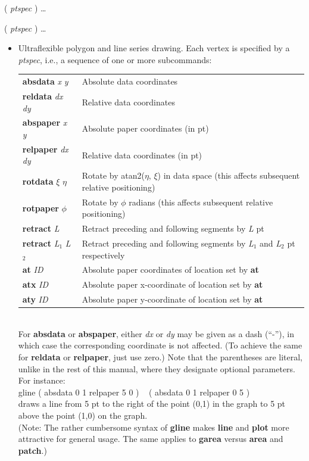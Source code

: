 \documentclass[11pt]{article}
\def\cmd#1#2{\noindent {\bf #1} #2\par}
\def\expl#1{\kern-8pt\begin{itemize}\item[]#1\end{itemize}}
\def\cref#1{{\bf #1}}
\begin{document}
\cmd{garea}{( \emph{ptspec} ) \ldots}
\cmd{gline}{( \emph{ptspec} ) \ldots}
\expl{Ultraflexible polygon and line series drawing. 
  Each vertex is specified by a \emph{ptspec}, i.e., a sequence of one or
  more subcommands:\medskip\\
\mbox{}\kern10pt\begin{tabular}{lp{3.8in}}
{\bf absdata} \emph{x} \emph{y} & Absolute data coordinates \\
{\bf reldata} \emph{dx} \emph{dy} & Relative data coordinates \\
{\bf abspaper} \emph{x} \emph{y} & Absolute paper coordinates (in pt)\\
{\bf relpaper} \emph{dx} \emph{dy} & Relative data coordinates (in
               pt)\\
{\bf rotdata} $\xi$ $\eta$ & Rotate by atan2($\eta$, $\xi$) 
              in data space (this affects subsequent relative
              positioning) \\
{\bf rotpaper} $\phi$ & Rotate by $\phi$ radians (this affects
subsequent relative positioning) \\
{\bf retract} \emph{L} & Retract preceding and following segments by
              \emph{L} pt \\
{\bf retract} \emph{L$_1$} \emph{L$_2$} & Retract preceding and following
              segments by \emph{L$_1$} and \emph{L$_2$} pt
              respectively \\
{\bf at} \emph{ID} & Absolute paper coordinates of location set by \cref{at} \\              
{\bf atx} \emph{ID} & Absolute paper x-coordinate of location set by \cref{at} \\              
{\bf aty} \emph{ID} & Absolute paper y-coordinate of location set by \cref{at} \\              
\end{tabular}\medskip\\
For {\bf absdata} or {\bf abspaper}, either \emph{dx} or \emph{dy} may
be given as a dash (``-''), in which case the corresponding coordinate
is not affected. (To achieve the same for {\bf reldata} or {\bf
  relpaper}, just use zero.)
Note that the parentheses are literal, unlike in the rest of this manual, where
they designate optional parameters. For instance:\medskip\\
\mbox{}\kern15pt
       gline ( absdata 0 1 relpaper 5 0 ) ~ ( absdata 0 1 relpaper 0 5 )
\medskip\\
     draws a line from 5 pt to the right of the point (0,1) in the graph to
     5 pt above the point (1,0) on the graph.\\
(Note: The rather cumbersome syntax of \cref{gline} makes \cref{line}
     and \cref{plot} more attractive for general usage. The same
     applies to \cref{garea} versus \cref{area} and \cref{patch}.)
}
\end{document}
